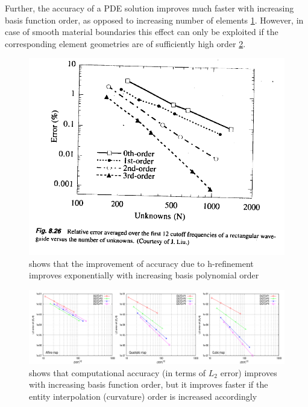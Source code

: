 \noindent
Further, the accuracy of a PDE solution improves much faster with increasing basis function order, as opposed to increasing number of elements \cite{jin2014} \cref{fig:jin:basisconv}. However, in case of smooth material boundaries this effect can only be exploited if the corresponding element geometries are of sufficiently high order \cite{fahs2011} \cref{fig:fahs:curvconv}.

\begin{figure}
    \centering
    \includegraphics[scale=0.4]{images/Jin-basis-function-efficiency}
	\captionsetup{width=0.8\textwidth} 
	\caption{ \citeauthor{jin2014} shows that the improvement of accuracy due to h-refinement improves exponentially with increasing basis polynomial order }
	\label{fig:jin:basisconv}
\end{figure}

\begin{figure}
    \includegraphics[scale=0.25]{images/fahs-convergence}
	\captionsetup{width=0.8\textwidth} 
	\caption{ \citeauthor{fahs2011} shows that computational accuracy (in terms of $L_2$ error) improves with increasing basis function order, but it improves faster if the entity interpolation (curvature) order is increased accordingly}
	\label{fig:fahs:curvconv}
\end{figure}


